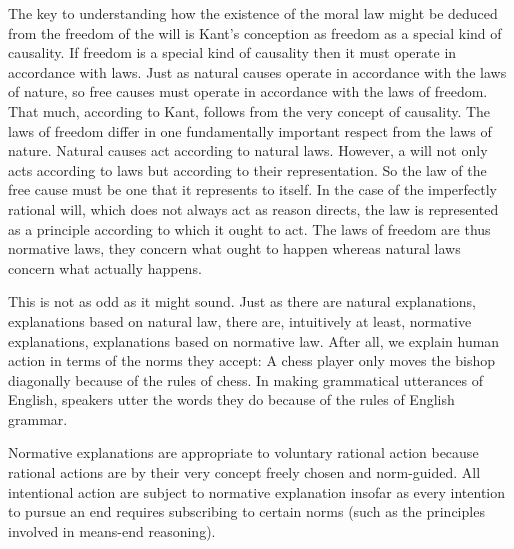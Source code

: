 The key to understanding how the existence of the moral law might be deduced from the freedom of the will is Kant’s conception as freedom as a special kind of causality. If freedom is a special kind of causality then it must operate in accordance with laws. Just as natural causes operate in accordance with the laws of nature, so free causes must operate in accordance with the laws of freedom. That much, according to Kant, follows from the very concept of causality. The laws of freedom differ in one fundamentally important respect from the laws of nature. Natural causes act according to natural laws. However, a will not only acts according to laws but according to their representation. So the law of the free cause must be one that it represents to itself. In the case of the imperfectly rational will, which does not always act as reason directs, the law is represented as a principle according to which it ought to act. The laws of freedom are thus normative laws, they concern what ought to happen whereas natural laws concern what actually happens. 

This is not as odd as it might sound. Just as there are natural explanations, explanations based on natural law, there are, intuitively at least, normative explanations, explanations based on normative law. After all, we explain human action in terms of the norms they accept: A chess player only moves the bishop diagonally because of the rules of chess. In making grammatical utterances of English, speakers utter the words they do because of the rules of English grammar.

Normative explanations are appropriate to voluntary rational action because rational actions are by their very concept freely chosen and norm-guided. All intentional action are subject to normative explanation insofar as every intention to pursue an end requires subscribing to certain norms (such as the principles involved in means-end reasoning). \change


